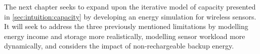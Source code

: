 The next chapter seeks to expand upon the iterative model of capacity presented in \cref{sec:intuition:capacity} by developing an energy simulation for wireless sensors. 
It will seek to address the three previously mentioned limitations by modelling energy income and storage more realistically, modelling sensor workload more dynamically, and considers the impact of non-rechargeable backup energy. 

%    
%    
%    
%     
%    
%    
%    
%     
%    
%     
%    
%
%  
%   
%    
%    
%    
%   
%    
%    
%    



